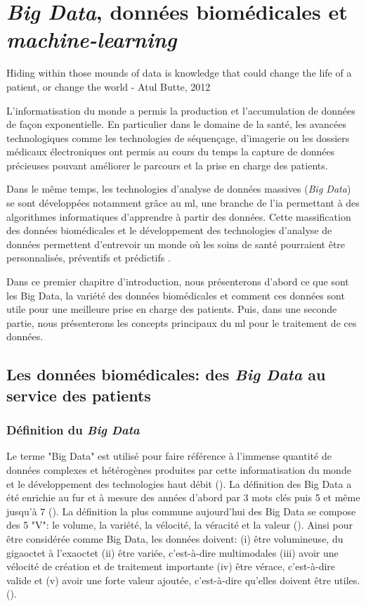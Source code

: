 \chapter{ \textit{Big Data}, données biomédicales et \textit{machine-learning}}

Hiding within those mounds of data is knowledge that could change the life of a patient, or change the world
- Atul Butte, 2012

L'informatisation du monde a permis la production et l'accumulation de données de façon exponentielle. En particulier dans le domaine de la santé, les avancées technologiques comme les technologies de séquençage, d'imagerie ou les dossiers médicaux électroniques ont permis au cours du temps la capture de données précieuses pouvant améliorer le parcours et la prise en charge des patients.

Dans le même temps, les technologies d'analyse de données massives (\textit{Big Data}) se sont développées notamment grâce au \gls{ml}, une branche de l'\gls{ia} permettant à des algorithmes informatiques d'apprendre à partir des données. Cette massification des données biomédicales et le développement des technologies d'analyse de données permettent d'entrevoir un monde où les soins de santé pourraient être personnalisés, préventifs et prédictifs .

Dans ce premier chapitre d'introduction, nous présenterons d'abord ce que sont les Big Data, la variété des données biomédicales et comment ces données sont utile pour une meilleure prise en charge des patients. Puis, dans une seconde partie, nous présenterons les concepts principaux du \gls{ml} pour le traitement de ces données.

\section{Les données biomédicales: des \textit{Big Data} au service des patients}

\subsection{Définition du \textit{Big Data}}

Le terme "Big Data" est utilisé pour faire référence à l'immense quantité de données complexes et hétérogènes produites par cette informatisation du monde et le développement des technologies haut débit (\cite{de_mauro_formal_2016}). La définition des Big Data a été enrichie au fur et à mesure des années d'abord par 3 mots clés puis 5 et même jusqu'à 7 (\cite{garcia_what_2022}). La définition la plus commune aujourd'hui des Big Data se compose des 5 "V": le volume, la variété, la vélocité, la véracité et la valeur (\cite{ishwarappa_brief_2015}). Ainsi pour être considérée comme Big Data, les données doivent: (i) être volumineuse, du gigaoctet à l'exaoctet (ii) être variée, c'est-à-dire multimodales (iii) avoir une vélocité de création et de traitement importante (iv) être vérace, c'est-à-dire valide et (v) avoir une forte valeur ajoutée, c'est-à-dire qu'elles doivent être utiles. (\cite{garcia_what_2022}).

